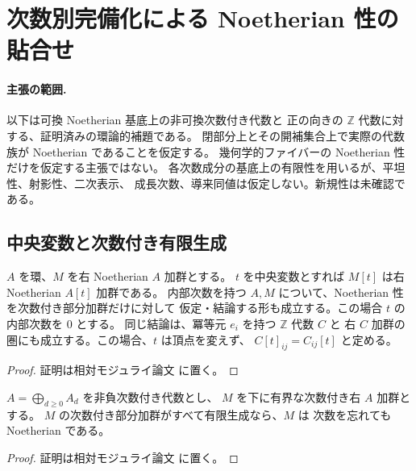 \section{次数別完備化による Noetherian 性の貼合せ}
\label{sec:formal-noetherian-patching}

\paragraph{主張の範囲.}
以下は可換 Noetherian 基底上の非可換次数付き代数と
正の向きの $\mathbb Z$ 代数に対する、証明済みの環論的補題である。
閉部分上とその開補集合上で実際の代数族が Noetherian であることを仮定する。
幾何学的ファイバーの Noetherian 性だけを仮定する主張ではない。
各次数成分の基底上の有限性を用いるが、平坦性、射影性、二次表示、
成長次数、導来同値は仮定しない。新規性は未確認である。

\subsection{中央変数と次数付き有限生成}

\begin{lemma}
\label{lem:patch-central-variable}
$A$ を環、$M$ を右 Noetherian $A$ 加群とする。
$t$ を中央変数とすれば $M[t]$ は右 Noetherian $A[t]$ 加群である。
内部次数を持つ $A,M$ について、Noetherian 性を次数付き部分加群だけに対して
仮定・結論する形も成立する。この場合 $t$ の内部次数を $0$ とする。
同じ結論は、冪等元 $e_i$ を持つ $\mathbb Z$ 代数 $C$ と
右 $C$ 加群の圏にも成立する。この場合、$t$ は頂点を変えず、
$C[t]_{ij}=C_{ij}[t]$ と定める。
\end{lemma}

\begin{proof}
証明は相対モジュライ論文 \cite[\texttt{relative_noetherian_patching}]{QuadricModuli2026} に置く。
\end{proof}

\begin{lemma}
\label{lem:patch-graded-to-ungraded}
$A=\bigoplus_{d\geq0}A_d$ を非負次数付き代数とし、
$M$ を下に有界な次数付き右 $A$ 加群とする。
$M$ の次数付き部分加群がすべて有限生成なら、$M$ は
次数を忘れても Noetherian である。
\end{lemma}

\begin{proof}
証明は相対モジュライ論文 \cite[\texttt{relative_noetherian_patching}]{QuadricModuli2026} に置く。
\end{proof}

